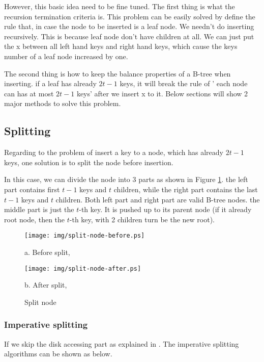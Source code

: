 \documentclass{article}
\begin{document}
However, this basic idea need to be fine tuned. The first thing is what
the recursion termination criteria is. This problem can be easily solved
by define the rule that, in case the node to be inserted is a leaf node.
We needn't do inserting recursively. This is because leaf node don't have
children at all. We can just put the x between all left hand keys and 
right hand keys, which cause the keys number of a leaf node increased by one.

The second thing is how to keep the balance properties of a B-tree when
inserting. if a leaf has already $2t-1$ keys, it will break the rule of '
each node can has at most $2t-1$ keys' after we insert x to it. Below
sections will show 2 major methods to solve this problem. 

\subsection{Splitting}
\label{split}
Regarding to the problem of insert a key to a node, which has already
$2t-1$ keys, one solution is to split the node before insertion.

In this case, we can divide the node into 3 parts as shown in 
Figure \ref{fig:node-split}. the left part contains first $t-1$ keys
and $t$ children, while the right part contains the last $t-1$ keys
and $t$ children. Both left part and right part are valid B-tree
nodes. the middle part is just the $t$-th key. It is pushed up
to its parent node (if it already root node, then the $t$-th key,
with 2 children turn be the new root).

\begin{figure}[htbp]
       \begin{center}
       	  \texttt{[image: img/split-node-before.ps]}

          a. Before split,

          \texttt{[image: img/split-node-after.ps]}

          b. After split, 
        \caption{Split node} \label{fig:node-split}
       \end{center}
\end{figure}

\subsubsection{Imperative splitting}
If we skip the disk accessing part as explained in \cite{CLRS}. The 
imperative splitting algorithms can be shown as below.
\end{document}
